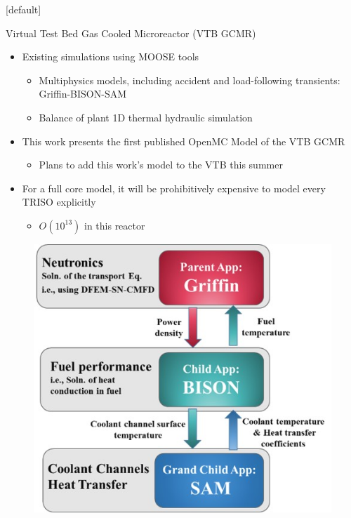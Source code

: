 \documentclass[9pt,t,aspectratio=169]{beamer}
\makeatletter
\newenvironment{withoutheadline}{
       \setbeamertemplate{headline}[default]
       \def\beamer@entrycode{\vspace*{-\headheight}}
    }{}
\makeatother
\begin{document}
\begin{withoutheadline}
\begin{frame}{Virtual Test Bed Gas Cooled Microreactor (VTB GCMR)}
    \pause
    \LARGE
    \begin{minipage}[t]{0.475\linewidth}
        \begin{itemize}
            \item<2-> Existing simulations using MOOSE tools
            \begin{itemize}
                \item<2-> Multiphysics models, including accident and load-following transients: Griffin-BISON-SAM \cite{Stauff-applications-2022,Abdelhameed-ANS-2022, HF_MRs_ANL}
                \item<2-> Balance of plant 1D thermal hydraulic simulation \cite{Duchnowski_plant_balance_2022}
            \end{itemize}
            \item<3-> This work presents the first published OpenMC Model of the VTB GCMR
            \begin{itemize}
                \item<3->Plans to add this work's model to the VTB this summer
            \end{itemize}
            \item<4-> For a full core model, it will be prohibitively expensive to model every TRISO explicitly
            \begin{itemize}
                \item<4-> $O(10^{13})$ in this reactor
            \end{itemize}
        \end{itemize}
    \end{minipage}
    \hfill%
    \begin{minipage}[t]{0.47\linewidth}
        \begin{figure}
            \centering
            \includegraphics[width=\linewidth]{figures/gcmr_preliminary_mutliapps.png}

\end{figure}
\end{minipage}
\end{frame}
\end{withoutheadline}
\end{document}
